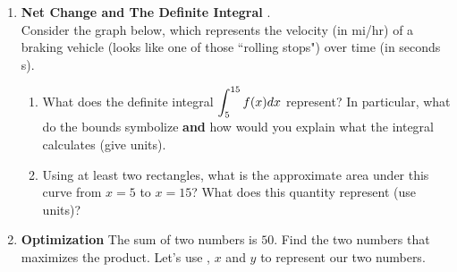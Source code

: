 \documentclass[10pt]{article}
\begin{document}
\begin{enumerate}
{\bf Calculus Phase}
 Think about the process you have been using to optimize other quantities. Use that process here to find the dimensions that maximize the area of the athletic field.

\newpage
\item {\bf Net Change and The Definite Integral} .\\
Consider the graph below, which represents the velocity (in mi/hr) of a braking vehicle (looks like one of those ``rolling stops") over time (in seconds s). 

    \begin{enumerate}
    \item What does the definite integral $\displaystyle \int_5^{15} f(x) dx$ represent? In particular, what do the bounds symbolize \textbf{ and } how would you explain what the integral calculates (give units).\\
    \item Using at least two rectangles, what is the approximate area under this curve from $x = 5$ to $x=15$? What does this quantity represent (use units)?\\
        \vfill

    \end{enumerate}

\newpage
\item {\bf Optimization} The sum of two numbers is $50$. Find the two numbers that maximizes the product. Let's use , $x$ and $y$ to represent our two numbers.


\end{enumerate}
\end{document}
